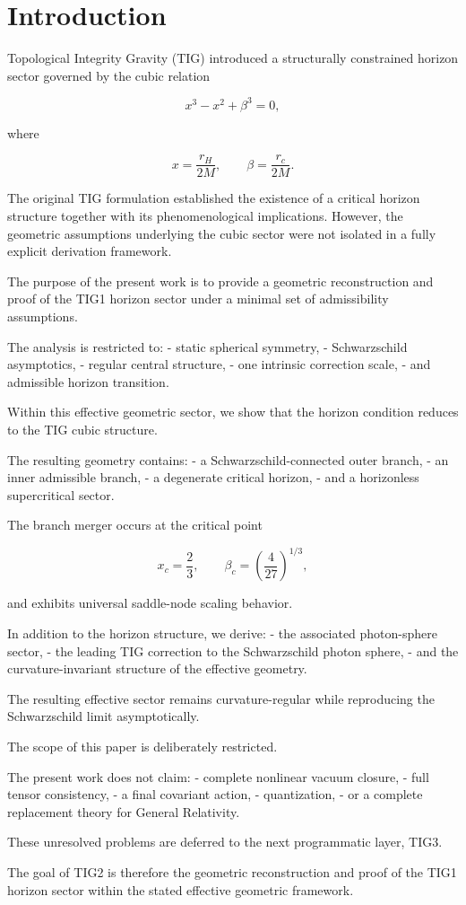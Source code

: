 \section{Introduction}

Topological Integrity Gravity (TIG) introduced a structurally constrained horizon sector governed by the cubic relation

$$
x^3-x^2+\beta^3=0,
$$

where

$$
x=\frac{r_H}{2M},
\qquad
\beta=\frac{r_c}{2M}.
$$

The original TIG formulation established the existence of a critical horizon structure together with its phenomenological implications. However, the geometric assumptions underlying the cubic sector were not isolated in a fully explicit derivation framework.

The purpose of the present work is to provide a geometric reconstruction and proof of the TIG1 horizon sector under a minimal set of admissibility assumptions.

The analysis is restricted to:
- static spherical symmetry,
- Schwarzschild asymptotics,
- regular central structure,
- one intrinsic correction scale,
- and admissible horizon transition.

Within this effective geometric sector, we show that the horizon condition reduces to the TIG cubic structure.

The resulting geometry contains:
- a Schwarzschild-connected outer branch,
- an inner admissible branch,
- a degenerate critical horizon,
- and a horizonless supercritical sector.

The branch merger occurs at the critical point

$$
x_c=\frac23,
\qquad
\beta_c=\left(\frac{4}{27}\right)^{1/3},
$$

and exhibits universal saddle-node scaling behavior.

In addition to the horizon structure, we derive:
- the associated photon-sphere sector,
- the leading TIG correction to the Schwarzschild photon sphere,
- and the curvature-invariant structure of the effective geometry.

The resulting effective sector remains curvature-regular while reproducing the Schwarzschild limit asymptotically.

The scope of this paper is deliberately restricted.

The present work does not claim:
- complete nonlinear vacuum closure,
- full tensor consistency,
- a final covariant action,
- quantization,
- or a complete replacement theory for General Relativity.

These unresolved problems are deferred to the next programmatic layer, TIG3.

The goal of TIG2 is therefore the geometric reconstruction and proof of the TIG1 horizon sector within the stated effective geometric framework.
